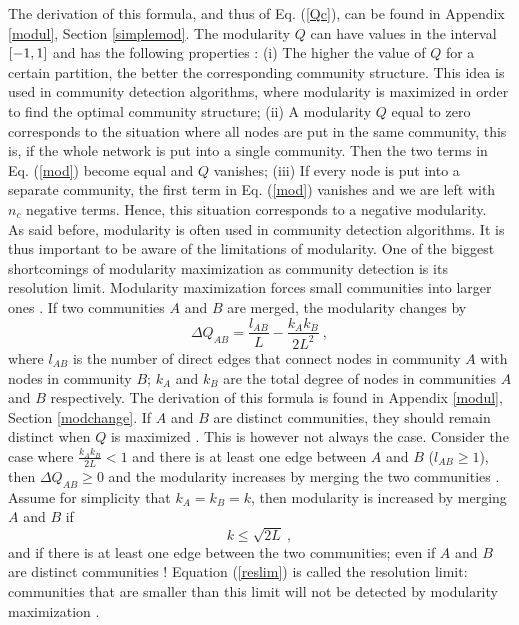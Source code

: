 \documentclass[11 pt , letterpaper , twoside , openright]{book}
\begin{document}
The derivation of this formula, and thus of Eq. (\ref{Qc}), can be found in Appendix \ref{modul}, Section \ref{simplemod}. The modularity $Q$ can have values in the interval $\interval{-1}{1}$ and has the following properties \cite{Albert2016}: (i) The higher the value of $Q$ for a certain partition, the better the corresponding community structure. This idea is used in community detection algorithms, where modularity is maximized in order to find the optimal community structure; (ii) A modularity $Q$ equal to zero corresponds to the situation where all nodes are put in the same community, this is, if the whole network is put into a single community. Then the two terms in Eq. (\ref{mod}) become equal and $Q$ vanishes; (iii) If every node is put into a separate community, the first term in Eq. (\ref{mod}) vanishes and we are left with $n_c$ negative terms. Hence, this situation corresponds to a negative modularity.\\
\newline
As said before, modularity is often used in community detection algorithms. It is thus important to be aware of the limitations of modularity. One of the biggest shortcomings of modularity maximization as community detection is its resolution limit. Modularity maximization forces small communities into larger ones \cite{Albert2016}. If two communities $A$ and $B$ are merged, the modularity changes by \cite{Albert2016}
\begin{equation}
	\Delta Q_{AB} = \frac{l_{AB}}{L} - \frac{k_Ak_B}{2L^2} \ ,
\end{equation}
where $l_{AB}$ is the number of direct edges that connect nodes in community $A$ with nodes in community $B$; $k_A$ and $k_B$ are the total degree of nodes in communities $A$ and $B$ respectively. The derivation of this formula is found in Appendix \ref{modul}, Section \ref{modchange}. If $A$ and $B$ are distinct communities, they should remain distinct when $Q$ is maximized \cite{Albert2016}. This is however not always the case. Consider the case where $\frac{k_Ak_B}{2L} < 1$ and there is at least one edge between $A$ and $B$ ($l_{AB} \geqslant 1$), then $\Delta Q_{AB} \geqslant 0$ and the modularity increases by merging the two communities \cite{Albert2016}. Assume for simplicity that $k_A = k_B = k$, then modularity is increased by merging $A$ and $B$ if
\begin{equation}\label{reslim}
	k \leqslant \sqrt{2L} \ ,
\end{equation}
and if there is at least one edge between the two communities; even if $A$ and $B$ are distinct communities \cite{Albert2016}! Equation (\ref{reslim}) is called the resolution limit: communities that are smaller than this limit will not be detected by modularity maximization \cite{Albert2016}.
\end{document}
